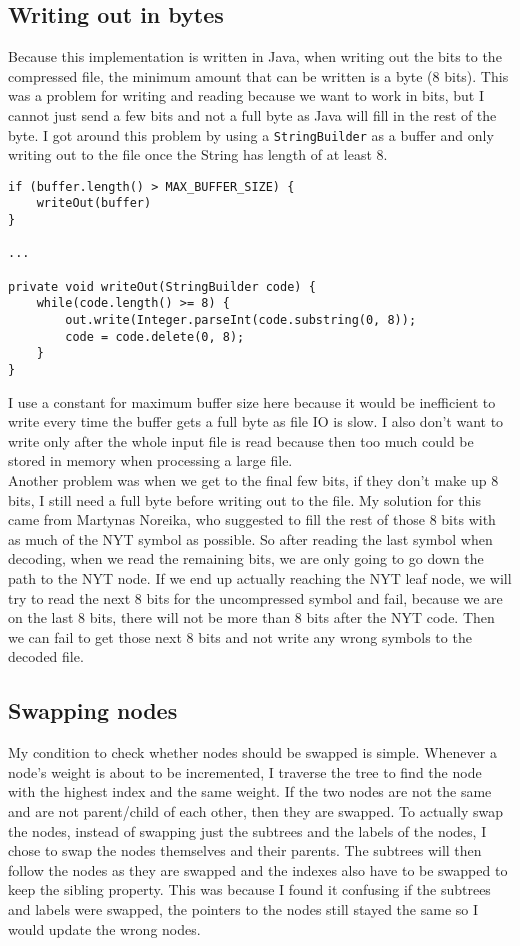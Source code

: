 \documentclass{article}
\newcommand{\n}[0]{\\[\baselineskip]}
\begin{document}
\subsection{Writing out in bytes}
Because this implementation is written in Java, when writing out the bits to the compressed file, the minimum amount that can be written is a byte (8 bits). This was a problem for writing and reading because we want to work in bits, but I cannot just send a few bits and not a full byte as Java will fill in the rest of the byte. I got around this problem by using a \texttt{StringBuilder} as a buffer and only writing out to the file once the String has length of at least 8.
\begin{lstlisting}
if (buffer.length() > MAX_BUFFER_SIZE) {
	writeOut(buffer)
}

...

private void writeOut(StringBuilder code) {
	while(code.length() >= 8) {
		out.write(Integer.parseInt(code.substring(0, 8));
		code = code.delete(0, 8);
	}
}
\end{lstlisting}
I use a constant for maximum buffer size here because it would be inefficient to write every time the buffer gets a full byte as file IO is slow. I also don't want to write only after the whole input file is read because then too much could be stored in memory when processing a large file. \n Another problem was when we get to the final few bits, if they don't make up 8 bits, I still need a full byte before writing out to the file. My solution for this came from Martynas Noreika, who suggested to fill the rest of those 8 bits with as much of the NYT symbol as possible. So after reading the last symbol when decoding, when we read the remaining bits, we are only going to go down the path to the NYT node. If we end up actually reaching the NYT leaf node, we will try to read the next 8 bits for the uncompressed symbol and fail, because we are on the last 8 bits, there will not be more than 8 bits after the NYT code. Then we can fail to get those next 8 bits and not write any wrong symbols to the decoded file. 
\subsection{Swapping nodes}
My condition to check whether nodes should be swapped is simple. Whenever a node's weight is about to be incremented, I traverse the tree to find the node with the highest index and the same weight. If the two nodes are not the same and are not parent/child of each other, then they are swapped. To actually swap the nodes, instead of swapping just the subtrees and the labels of the nodes, I chose to swap the nodes themselves and their parents. The subtrees will then follow the nodes as they are swapped and the indexes also have to be swapped to keep the sibling property. This was because I found it confusing if the subtrees and labels were swapped, the pointers to the nodes still stayed the same so I would update the wrong nodes. 
\end{document}
